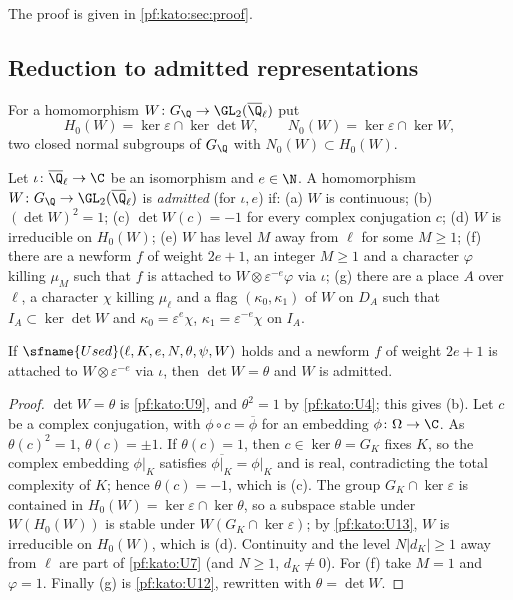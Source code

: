The proof is given in \cref{pf:kato:sec:proof}.

\subsection{Reduction to admitted representations}\label{pf:kato:sec:reduction}

For a homomorphism $W\colon G_\Q\to\GL_2(\katoQlb)$ put
\[
  H_0(W)=\ker\varepsilon\cap\ker\det W,\qquad N_0(W)=\ker\varepsilon\cap\ker W,
\]
two closed normal subgroups of $G_\Q$ with $N_0(W)\subset H_0(W)$.

\begin{definition}\label{pf:kato:def:admitted}
Let $\iota\colon\katoQlb\to\C$ be an isomorphism and $e\in\N$. A homomorphism $W\colon G_\Q\to\GL_2(\katoQlb)$ is
\emph{admitted} (for $\iota,e$) if:
(a) $W$ is continuous; (b) $(\det W)^2=1$; (c) $\det W(c)=-1$ for every complex conjugation $c$; (d) $W$ is
irreducible on $H_0(W)$; (e) $W$ has level $M$ away from $\ell$ for some $M\ge1$; (f) there are a newform $f$ of
weight $2e+1$, an integer $M\ge1$ and a character $\varphi$ killing $\mu_M$ such that $f$ is attached to
$W\otimes\varepsilon^{-e}\varphi$ via $\iota$; (g) there are a place $A$ over $\ell$, a character $\chi$ killing
$\mu_\ell$ and a flag $(\kappa_0,\kappa_1)$ of $W$ on $D_A$ such that $I_A\subset\ker\det W$ and
$\kappa_0=\varepsilon^e\chi$, $\kappa_1=\varepsilon^{-e}\chi$ on $I_A$.
\end{definition}

\begin{lemma}\label{pf:kato:usedadm}
If $\sfname{Used}(\ell,K,e,N,\theta,\psi,W)$ holds and a newform $f$ of weight $2e+1$ is attached to
$W\otimes\varepsilon^{-e}$ via $\iota$, then $\det W=\theta$ and $W$ is admitted.
\end{lemma}

\begin{proof}
$\det W=\theta$ is \ref{pf:kato:U9}, and $\theta^2=1$ by \ref{pf:kato:U4}; this gives (b). Let $c$ be a complex
conjugation, with $\phi\circ c=\overline\phi$ for an embedding $\phi\colon\Omega\to\C$. As $\theta(c)^2=1$,
$\theta(c)=\pm1$. If $\theta(c)=1$, then $c\in\ker\theta=G_K$ fixes $K$, so the complex embedding
$\phi|_K$ satisfies $\overline{\phi|_K}=\phi|_K$ and is real, contradicting the total complexity of $K$; hence
$\theta(c)=-1$, which is (c). The group $G_K\cap\ker\varepsilon$ is contained in
$H_0(W)=\ker\varepsilon\cap\ker\theta$, so a subspace stable under $W(H_0(W))$ is stable under
$W(G_K\cap\ker\varepsilon)$; by \ref{pf:kato:U13}, $W$ is irreducible on $H_0(W)$, which is (d). Continuity and
the level $N|d_K|\ge1$ away from $\ell$ are part of \ref{pf:kato:U7} (and $N\ge1$, $d_K\ne0$). For (f) take
$M=1$ and $\varphi=1$. Finally (g) is \ref{pf:kato:U12}, rewritten with $\theta=\det W$.
\end{proof}

